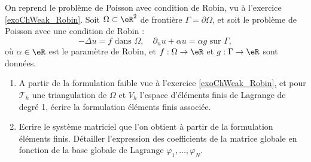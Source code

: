\begin{exercice}\label{exoChMEF_Robin}

On reprend le problème de Poisson avec condition de Robin, vu à l'exercice \ref{exoChWeak_Robin}.
%
Soit $\Omega \subset \eR^2$ de frontière $\Gamma = \partial \Omega$, et 
soit le problème de Poisson avec une condition de Robin :
\begin{equation*} %
- \Delta u = f \mbox{ dans } \Omega, \quad \partial_n u + \alpha u = \alpha g \mbox{ sur } \Gamma,
\end{equation*}
où $\alpha \in \eR$ est le paramètre de Robin, et $f : \Omega \rightarrow \eR$ et $g : \Gamma \rightarrow \eR$ sont données.

\begin{enumerate}

\item A partir de la formulation faible vue à l'exercice \ref{exoChWeak_Robin}, et pour $\mathcal{T}_h$ une triangulation de $\Omega$ et $V_h$ l'espace d'éléments finis de Lagrange de degré 1, écrire la formulation éléments finis associée.

\item Ecrire le système matriciel que l'on obtient à partir de la formulation éléments finis. Détailler l'expression des coefficients de la matrice globale en fonction de la base globale de Lagrange $\varphi_1,\ldots,\varphi_N$.

\end{enumerate}

\end{exercice}




\newpage

\corrChapitre

